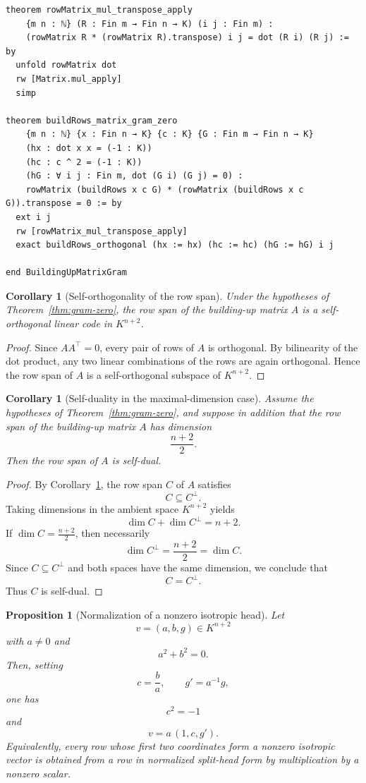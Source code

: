 \documentclass[12pt]{article}
\newtheorem{prop}[theorem]{Proposition}
\newtheorem{cor}[theorem]{Corollary}
\begin{document}
\begin{lstlisting}[caption={Lean verification for Theorem~\ref{thm:gram-zero}.}]
theorem rowMatrix_mul_transpose_apply
    {m n : ℕ} (R : Fin m → Fin n → K) (i j : Fin m) :
    (rowMatrix R * (rowMatrix R).transpose) i j = dot (R i) (R j) := by
  unfold rowMatrix dot
  rw [Matrix.mul_apply]
  simp

theorem buildRows_matrix_gram_zero
    {m n : ℕ} {x : Fin n → K} {c : K} {G : Fin m → Fin n → K}
    (hx : dot x x = (-1 : K))
    (hc : c ^ 2 = (-1 : K))
    (hG : ∀ i j : Fin m, dot (G i) (G j) = 0) :
    rowMatrix (buildRows x c G) * (rowMatrix (buildRows x c G)).transpose = 0 := by
  ext i j
  rw [rowMatrix_mul_transpose_apply]
  exact buildRows_orthogonal (hx := hx) (hc := hc) (hG := hG) i j

end BuildingUpMatrixGram
\end{lstlisting}

\begin{cor}[Self-orthogonality of the row span]
\label{cor:self-orthogonal-row-span}
Under the hypotheses of Theorem~\ref{thm:gram-zero}, the row span of the building-up matrix $A$ is a self-orthogonal linear code in $K^{n+2}$.
\end{cor}

\begin{proof}
Since $AA^\top=0$, every pair of rows of $A$ is orthogonal. By bilinearity of the dot product, any two linear combinations of the rows are again orthogonal. Hence the row span of $A$ is a self-orthogonal subspace of $K^{n+2}$.
\end{proof}

\begin{cor}[Self-duality in the maximal-dimension case]
\label{cor:self-dual-maximal}
Assume the hypotheses of Theorem~\ref{thm:gram-zero}, and suppose in addition that the row span of the building-up matrix $A$ has dimension
\[
\frac{n+2}{2}.
\]
Then the row span of $A$ is self-dual.
\end{cor}

\begin{proof}
By Corollary~\ref{cor:self-orthogonal-row-span}, the row span $C$ of $A$ satisfies
\[
C \subseteq C^\perp.
\]
Taking dimensions in the ambient space $K^{n+2}$ yields
\[
\dim C + \dim C^\perp = n+2.
\]
If $\dim C = \frac{n+2}{2}$, then necessarily
\[
\dim C^\perp = \frac{n+2}{2} = \dim C.
\]
Since $C\subseteq C^\perp$ and both spaces have the same dimension, we conclude that
\[
C=C^\perp.
\]
Thus $C$ is self-dual.
\end{proof}

\begin{prop}[Normalization of a nonzero isotropic head]
\label{prop:head-normalization}
Let
\[
v=(a,b,g)\in K^{n+2}
\]
with $a\neq 0$ and
\[
a^2+b^2=0.
\]
Then, setting
\[
c=\frac{b}{a},
\qquad
g' = a^{-1} g,
\]
one has
\[
c^2=-1
\]
and
\[
v = a\,(1,c,g').
\]
Equivalently, every row whose first two coordinates form a nonzero isotropic vector is obtained from a row in normalized split-head form by multiplication by a nonzero scalar.
\end{prop}
\end{document}
